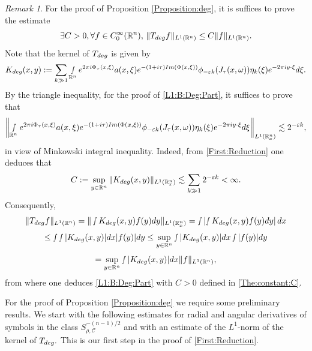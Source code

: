 \documentclass[12pt, reqno]{amsart}
\theoremstyle{definition}
\theoremstyle{remark}
\newtheorem{remark}[theorem]{Remark}
\numberwithin{equation}{section}
\begin{document}
\begin{remark}\label{remark:final:part:proof}
    For the proof of Proposition \ref{Proposition:deg}, 
it is suffices to prove the estimate
\begin{equation}\label{L1:B:Deg:Part}
    \exists C>0,\forall f\in C^\infty_0(\mathbb{R}^n),\, \Vert T_{\textnormal{deg}} f \Vert_{L^1(\mathbb{R}^n)}\leq C\Vert f\Vert_{L^1(\mathbb{R}^n)}.
\end{equation}Note that the kernel of $T_{\textnormal{deg}}$ is given by
\begin{equation*}
    K_{\textnormal{deg}}(x,y):=\sum_{k\gg 1}\smallint\limits_{\mathbb{R}^n}e^{2\pi i\Phi_\tau(x,\xi)}a(x,\xi)e^{-(1+i\tau)\textnormal{Im}(\Phi(x,\xi))}\phi_{-\varepsilon k}(J_{\tau}(x,\omega))\eta_{k}(\xi)e^{-2\pi i y\cdot \xi}d\xi.
\end{equation*}By the triangle inequality, for the proof of \eqref{L1:B:Deg:Part}, it suffices to prove that  
\begin{equation}\label{First:Reduction}
    \left\Vert \smallint\limits_{\mathbb{R}^n}e^{2\pi i\Phi_\tau(x,\xi)}a(x,\xi)e^{-(1+i\tau)\textnormal{Im}(\Phi(x,\xi))}\phi_{-\varepsilon k}(J_{\tau}(x,\omega))\eta_{k}(\xi)e^{-2\pi i y\cdot \xi}   d\xi \right\Vert_{L^1(\mathbb{R}^n_x)}\lesssim 2^{-\varepsilon k},
\end{equation} in view of Minkowski integral inequality. Indeed, from \eqref{First:Reduction} one deduces that
\begin{equation}\label{The:constant:C}
  C:=\sup_{y\in \mathbb{R}^n}\Vert  K_{\textnormal{deg}}(x,y) \Vert_{L^1(\mathbb{R}^n_x)}\lesssim\sum_{k\gg 1}2^{-\varepsilon k}<\infty.   
\end{equation}
Consequently,
$$
 \Vert T_{\textnormal{deg}} f \Vert_{L^1(\mathbb{R}^n)}=   \Vert \smallint K_{\textnormal{deg}}(x,y)f(y)dy\Vert_{L^1(\mathbb{R}^n_x)}=\smallint\left|\smallint K_{\textnormal{deg}}(x,y)f(y)dy\right|dx$$
    $$\leq \smallint\smallint |K_{\textnormal{deg}}(x,y)|dx|f(y)|dy\leq \sup_{y\in \mathbb{R}^n} \smallint |K_{\textnormal{deg}}(x,y)|dx\smallint|f(y)|dy $$
     $$ = \sup_{y\in \mathbb{R}^n} \smallint |K_{\textnormal{deg}}(x,y)|dx\|f\|_{L^1(\mathbb{R}^n)},$$ from where one deduces \eqref{L1:B:Deg:Part} with $C>0$ defined in \eqref{The:constant:C}.
\end{remark}
For the proof of Proposition \ref{Proposition:deg} we require some preliminary results. We start with the following estimates for radial and angular derivatives of symbols in the class $S^{-(n-1)/2}_{\rho,\mathscr{C}}$ and with an estimate of the $L^1$-norm of the kernel of $T_{\textnormal{deg}}.$ This is our first step in the proof of \eqref{First:Reduction}.
\end{document}
